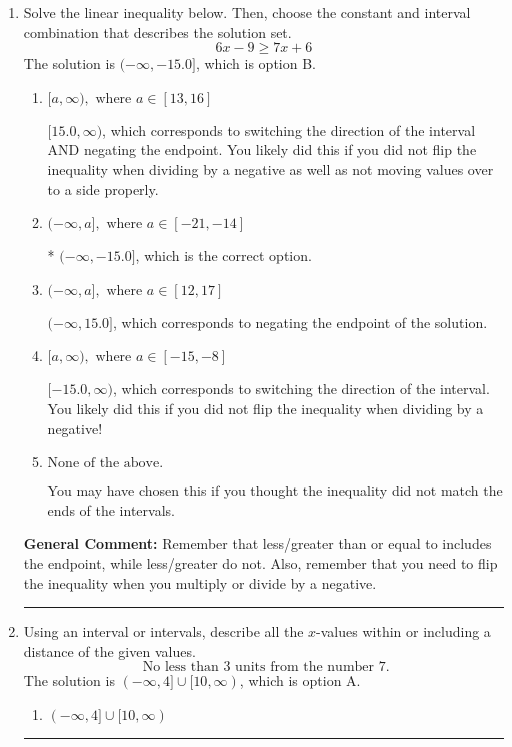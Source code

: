 \documentclass{extbook}[14pt]
\newcommand{\litem}[1]{\item #1

\rule{\textwidth}{0.4pt}}
\begin{document}
\begin{enumerate}
{\begin{enumerate}[label=\Alph*.]
This describes the values less than 9 from 6
\item \( \text{None of the above} \)

Options A-D described the values [more/less than] 9 units from 6, which is the reverse of what the question asked.
\end{enumerate}

\textbf{General Comment:} When thinking about this language, it helps to draw a number line and try points.
}
\litem{
Solve the linear inequality below. Then, choose the constant and interval combination that describes the solution set.
\[ 6x -9 \geq 7x + 6 \]
The solution is \( (-\infty, -15.0] \), which is option B.\begin{enumerate}[label=\Alph*.]
\item \( [a, \infty), \text{ where } a \in [13, 16] \)

 $[15.0, \infty)$, which corresponds to switching the direction of the interval AND negating the endpoint. You likely did this if you did not flip the inequality when dividing by a negative as well as not moving values over to a side properly.
\item \( (-\infty, a], \text{ where } a \in [-21, -14] \)

* $(-\infty, -15.0]$, which is the correct option.
\item \( (-\infty, a], \text{ where } a \in [12, 17] \)

 $(-\infty, 15.0]$, which corresponds to negating the endpoint of the solution.
\item \( [a, \infty), \text{ where } a \in [-15, -8] \)

 $[-15.0, \infty)$, which corresponds to switching the direction of the interval. You likely did this if you did not flip the inequality when dividing by a negative!
\item \( \text{None of the above}. \)

You may have chosen this if you thought the inequality did not match the ends of the intervals.
\end{enumerate}

\textbf{General Comment:} Remember that less/greater than or equal to includes the endpoint, while less/greater do not. Also, remember that you need to flip the inequality when you multiply or divide by a negative.
}
\litem{
Using an interval or intervals, describe all the $x$-values within or including a distance of the given values.
\[ \text{ No less than } 3 \text{ units from the number } 7. \]
The solution is \( (-\infty, 4] \cup [10, \infty) \), which is option A.\begin{enumerate}[label=\Alph*.]
\item \( (-\infty, 4] \cup [10, \infty) \)


\end{enumerate}}
\end{enumerate}
\end{document}

